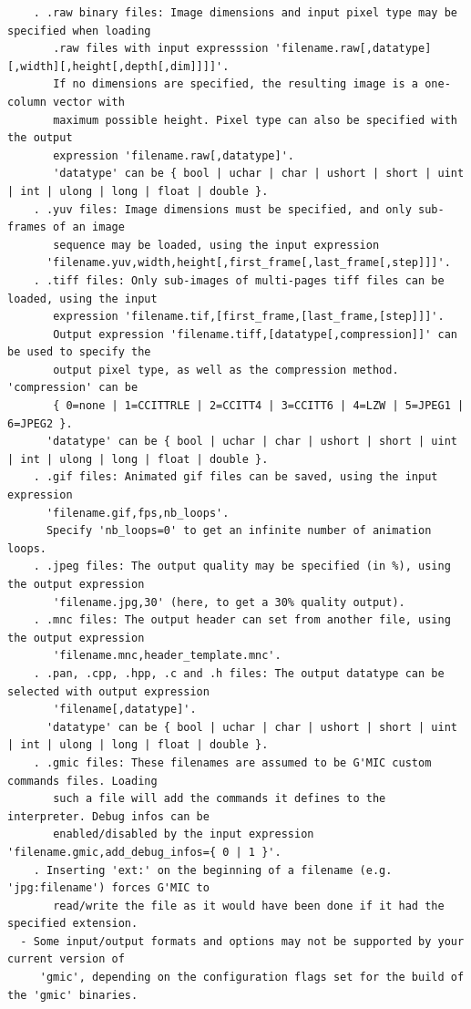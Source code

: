 \documentclass[a4paper,11pt,twoside]{book}
\begin{document}
\begin{lstlisting}
    . .raw binary files: Image dimensions and input pixel type may be specified when loading 
       .raw files with input expresssion 'filename.raw[,datatype][,width][,height[,depth[,dim]]]]'. 
       If no dimensions are specified, the resulting image is a one-column vector with 
       maximum possible height. Pixel type can also be specified with the output 
       expression 'filename.raw[,datatype]'. 
       'datatype' can be { bool | uchar | char | ushort | short | uint | int | ulong | long | float | double }. 
    . .yuv files: Image dimensions must be specified, and only sub-frames of an image 
       sequence may be loaded, using the input expression 
      'filename.yuv,width,height[,first_frame[,last_frame[,step]]]'. 
    . .tiff files: Only sub-images of multi-pages tiff files can be loaded, using the input 
       expression 'filename.tif,[first_frame,[last_frame,[step]]]'. 
       Output expression 'filename.tiff,[datatype[,compression]]' can be used to specify the 
       output pixel type, as well as the compression method. 'compression' can be 
       { 0=none | 1=CCITTRLE | 2=CCITT4 | 3=CCITT6 | 4=LZW | 5=JPEG1 | 6=JPEG2 }. 
      'datatype' can be { bool | uchar | char | ushort | short | uint | int | ulong | long | float | double }. 
    . .gif files: Animated gif files can be saved, using the input expression 
      'filename.gif,fps,nb_loops'. 
      Specify 'nb_loops=0' to get an infinite number of animation loops. 
    . .jpeg files: The output quality may be specified (in %), using the output expression 
       'filename.jpg,30' (here, to get a 30% quality output). 
    . .mnc files: The output header can set from another file, using the output expression 
       'filename.mnc,header_template.mnc'. 
    . .pan, .cpp, .hpp, .c and .h files: The output datatype can be selected with output expression 
       'filename[,datatype]'. 
      'datatype' can be { bool | uchar | char | ushort | short | uint | int | ulong | long | float | double }. 
    . .gmic files: These filenames are assumed to be G'MIC custom commands files. Loading 
       such a file will add the commands it defines to the interpreter. Debug infos can be 
       enabled/disabled by the input expression 'filename.gmic,add_debug_infos={ 0 | 1 }'. 
    . Inserting 'ext:' on the beginning of a filename (e.g. 'jpg:filename') forces G'MIC to 
       read/write the file as it would have been done if it had the specified extension. 
  - Some input/output formats and options may not be supported by your current version of 
     'gmic', depending on the configuration flags set for the build of the 'gmic' binaries.
\end{lstlisting}
\normalsize
\end{document}
